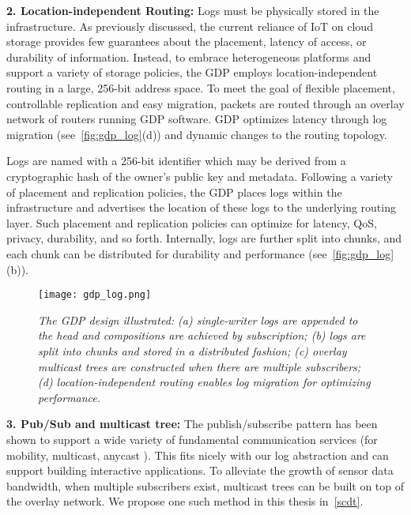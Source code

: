 \textbf{2. Location-independent Routing:} Logs must be physically
stored in the infrastructure. As previously discussed,
the current reliance of IoT on cloud storage provides
few guarantees about the placement, latency of access,
or durability of information. Instead, to embrace heterogeneous
platforms and support a variety of storage
policies, the GDP employs location-independent routing
in a large, 256-bit address space. To meet the goal of
flexible placement, controllable replication and easy migration,
packets are routed through an overlay network of routers running GDP software. GDP optimizes latency through log migration (see~\autoref{fig:gdp_log}(d))
and dynamic changes to the routing topology.

Logs are named with a 256-bit identifier which may be
derived from a cryptographic hash of the owner’s public
key and metadata. Following a variety of placement and
replication policies,
the GDP places logs within the infrastructure
and advertises the location of these logs to the
underlying routing layer. Such placement and replication
policies can optimize for latency, QoS, privacy, durability,
and so forth. Internally, logs are further split into chunks,
and each chunk can be distributed for durability \cite{oceanstore} and
performance \cite{bolt} (see~\autoref{fig:gdp_log}(b)).

\begin{figure}[t]
	\begin{center}
		\texttt{[image: gdp\_log.png]}
	\end{center}
	\vspace{-1.3em}
	\caption{\small \itshape  The GDP design illustrated: (a) single-writer logs are appended to the head and compositions are achieved by subscription;
		(b) logs are split into chunks and stored in a distributed fashion; (c) overlay multicast trees are constructed when there are multiple
		subscribers; (d) location-independent routing enables log migration for optimizing performance.}
	\vspace{-1em}
	\label{fig:gdp_log}
\end{figure}

\textbf{3. Pub/Sub and multicast tree:} The publish/subscribe
pattern has been shown to support a wide variety of fundamental
communication services (for mobility, multicast,
anycast \cite{indirection}). This fits nicely with our log abstraction
and can support building interactive applications. To
alleviate the growth of sensor data bandwidth, when multiple
subscribers exist, multicast trees can be built on top
of the overlay network.  We propose one such method in this thesis in~\autoref{scdt}.

